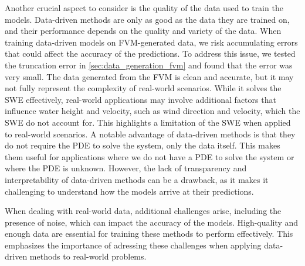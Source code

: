 Another crucial aspect to consider is the quality of the data used to train the models.
Data-driven methods are only as good as the data they are trained on, and their performance depends on the quality and variety of the data.
When training data-driven models on FVM-generated data, we risk accumulating errors that could affect the accuracy of the predictions.
To address this issue, we tested the truncation error in \autoref{sec:data_generation_fvm} and found that the error was very small.
The data generated from the FVM is clean and accurate, but it may not fully represent the complexity of real-world scenarios.
While it solves the SWE effectively, real-world applications may involve additional factors that influence water height and velocity, such as wind direction and velocity, which the SWE do not account for.
This highlights a limitation of the SWE when applied to real-world scenarios.
A notable advantage of data-driven methods is that they do not require the PDE to solve the system, only the data itself.
This makes them useful for applications where we do not have a PDE to solve the system or where the PDE is unknown.
However, the lack of transparency and interpretability of data-driven methods can be a drawback, as it makes it challenging to understand how the models arrive at their predictions.

When dealing with real-world data, additional challenges arise, including the presence of noise, which can impact the accuracy of the models.
High-quality and enough data are essential for training these methods to perform effectively.
This emphasizes the importance of adressing these challenges when applying data-driven methods to real-world problems.







